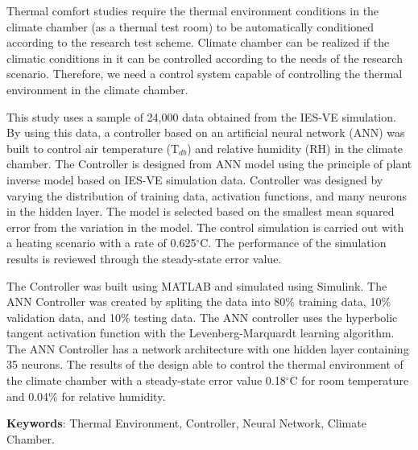 Thermal comfort studies require the thermal environment conditions in the climate chamber (as a thermal test room) to be automatically conditioned according to the research test scheme. Climate chamber can be realized if the climatic conditions in it can be controlled according to the needs of the research scenario. Therefore, we need a control system capable of controlling the thermal environment in the climate chamber.

This study uses a sample of 24,000 data obtained from the IES-VE simulation. By using this data, a controller based on an artificial neural network (ANN) was built to control air temperature (T$_{db}$) and relative humidity (RH) in the climate chamber. The Controller is designed from ANN model using the principle of plant inverse model based on IES-VE simulation data. Controller was designed by varying the distribution of training data, activation functions, and many neurons in the hidden layer. The model is selected based on the smallest mean squared error from the variation in the model. The control simulation is carried out with a heating scenario with a rate of 0.625$^\circ$C. The performance of the simulation results is reviewed through the steady-state error value.

The Controller was built using MATLAB and simulated using Simulink. The ANN Controller was created by spliting the data into 80\% training data, 10\% validation data, and 10\% testing data. The ANN controller uses the hyperbolic tangent activation function with the Levenberg-Marquardt learning algorithm. The ANN Controller has a network architecture with one hidden layer containing 35 neurons. The results of the design able to control the thermal environment of the climate chamber with a steady-state error value 0.18$^\circ$C for room temperature and 0.04\% for relative humidity.

\vspace{0.4cm}
\hspace{-1.2cm}
\textbf{Keywords}: Thermal Environment, Controller, Neural Network, Climate Chamber.


